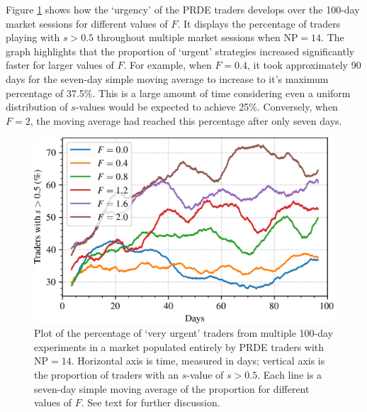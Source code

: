 \documentclass[conference]{IEEEtran}
\begin{document}
Figure \ref{k=14_strats} shows how the `urgency' of the PRDE traders develops over the 100-day market sessions for different values of $F$.
It displays the percentage of traders playing with $s>0.5$ throughout multiple market sessions when $\mathrm{NP}=14$.
The graph highlights that the proportion of `urgent' strategies increased significantly faster for larger values of $F$.
For example, when $F=0.4$, it took approximately 90 days for the seven-day simple moving average to increase to it's maximum percentage of 37.5\%.
This is a large amount of time considering even a uniform distribution of $s$-values would be expected to achieve 25\%.
Conversely, when $F=2$, the moving average had reached this percentage after only seven days.

\begin{figure}[htbp]
    \centerline{\includegraphics[width=\columnwidth]{k=14_strats.png}}
    \caption{
        Plot of the percentage of `very urgent' traders from multiple 100-day experiments in a market populated entirely by PRDE traders with $\mathrm{NP}=14$.
        Horizontal axis is time, measured in days; vertical axis is the proportion of traders with an $s$-value of $s>0.5$.
        Each line is a seven-day simple moving average of the proportion for different values of $F$.
        See text for further discussion.
    }
    \label{k=14_strats}
\end{figure}
\end{document}

